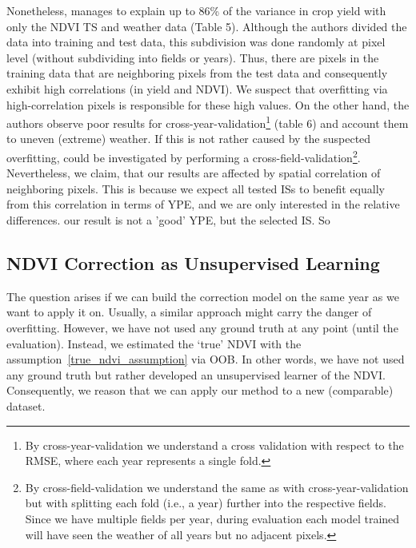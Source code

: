 {{        Nonetheless, \cite{perichPixelbasedCropYield2022} manages to explain up to 86\% of the variance in crop yield with only the NDVI TS and weather data (Table 5).  Although the authors divided the data into training and test data, this subdivision was done randomly at pixel level (without subdividing into fields or years). Thus, there are pixels in the training data that are neighboring pixels from the test data and consequently exhibit high correlations (in yield and NDVI). We suspect that overfitting via high-correlation pixels is responsible for these high values. On the other hand, the authors observe poor results for cross-year-validation\footnote{By cross-year-validation we understand a cross validation with respect to the RMSE, where each year represents a single fold.} (table 6) and account them to uneven (extreme) weather.  If this is not rather caused by the suspected overfitting, could be investigated by performing a cross-field-validation\footnote{By cross-field-validation we understand the same as with cross-year-validation but with splitting each fold (i.e., a year) further into the respective fields. Since we have multiple fields per year, during evaluation each model trained will have seen the weather of all years but no adjacent pixels.}.%
        Nevertheless, we claim, that our results are affected by spatial correlation of neighboring pixels. This is because we expect all tested ISs to benefit equally from this correlation in terms of YPE, and we are only interested in the relative differences. our result is not a 'good' YPE, but the selected IS. So 
    }

    \subsection{NDVI Correction as Unsupervised Learning}
        The question arises if we can build the correction model on the same year as we want to apply it on. Usually, a similar approach might carry the danger of overfitting. However, we have not used any ground truth at any point (until the evaluation). Instead, we estimated the `true' NDVI with the assumption~\ref{true_ndvi_assumption} via OOB. In other words, we have not used any ground truth but rather developed an unsupervised learner of the NDVI. Consequently, we reason that we can apply our method to a new (comparable) dataset.
}
